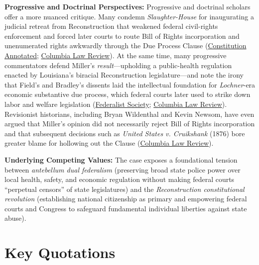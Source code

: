 \documentclass[12pt]{article}
\begin{document}
\textbf{Progressive and Doctrinal Perspectives:} Progressive and doctrinal scholars offer a more nuanced critique. Many condemn \textit{Slaughter-House} for inaugurating a judicial retreat from Reconstruction that weakened federal civil-rights enforcement and forced later courts to route Bill of Rights incorporation and unenumerated rights awkwardly through the Due Process Clause (\href{https://www.law.cornell.edu/constitution-conan/amendment-14/section-1/slaughter-house}{Constitution Annotated}; \href{https://columbialawreview.org/content/killing-precedent-the-slaughter-house-constitution/}{Columbia Law Review}). At the same time, many progressive commentators defend Miller's \textit{result}---upholding a public-health regulation enacted by Louisiana's biracial Reconstruction legislature---and note the irony that Field's and Bradley's dissents laid the intellectual foundation for \textit{Lochner}-era economic substantive due process, which federal courts later used to strike down labor and welfare legislation (\href{https://fedsoc.org/case/the-slaughter-house-cases}{Federalist Society}; \href{https://columbialawreview.org/content/killing-precedent-the-slaughter-house-constitution/}{Columbia Law Review}). Revisionist historians, including Bryan Wildenthal and Kevin Newsom, have even argued that Miller's opinion did not necessarily reject Bill of Rights incorporation and that subsequent decisions such as \textit{United States v. Cruikshank} (1876) bore greater blame for hollowing out the Clause (\href{https://columbialawreview.org/content/killing-precedent-the-slaughter-house-constitution/}{Columbia Law Review}).

\textbf{Underlying Competing Values:} The case exposes a foundational tension between \textit{antebellum dual federalism} (preserving broad state police power over local health, safety, and economic regulation without making federal courts ``perpetual censors'' of state legislatures) and the \textit{Reconstruction constitutional revolution} (establishing national citizenship as primary and empowering federal courts and Congress to safeguard fundamental individual liberties against state abuse).

\section{Key Quotations}
\end{document}
